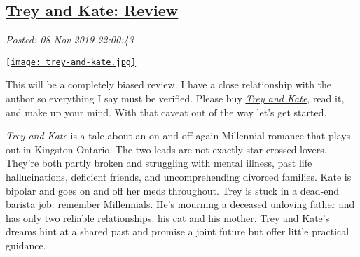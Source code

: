 %

\subsection*{\href{http://analyzethedatanotthedrivel.org/2019/11/08/trey-and-kate-review/}{Trey and Kate: Review}}


\noindent\emph{Posted: 08 Nov 2019 22:00:43}
\vspace{6pt}


\captionsetup[floatingfigure]{labelformat=empty}
\begin{floatingfigure}[l]{0.25\textwidth}
\centering
\href{https://www.amazon.com/gp/product/1687011508/ref=x_gr_w_bb_glide_sout?ie=UTF8\&tag=x_gr_w_bb_glide_sout-20\&linkCode=as2\&camp=1789\&creative=9325\&creativeASIN=1687011508\&SubscriptionId=1MGPYB6YW3HWK55XCGG2}{\texttt{[image: trey-and-kate.jpg]}}
\label{fig:5625x0}
\end{floatingfigure}

This will be a completely biased review.
I have a close relationship with the author so 
everything I say must be verified. Please buy \emph{\href{https://www.amazon.com/gp/product/1687011508/ref=x_gr_w_bb_glide_sout?ie=UTF8\&tag=x_gr_w_bb_glide_sout-20\&linkCode=as2\&camp=1789\&creative=9325\&creativeASIN=1687011508\&SubscriptionId=1MGPYB6YW3HWK55XCGG2}{Trey
and Kate}}, read it, and make up your mind. With that
caveat out of the way let's get started.

\emph{Trey and Kate} is a tale about an on and off again Millennial
romance that plays out in Kingston Ontario. The two leads are not
exactly star crossed lovers. They're both partly broken and struggling
with mental illness, past life hallucinations, deficient friends, and
uncomprehending divorced families. Kate is bipolar and goes on and off
her meds throughout. Trey is stuck in a dead-end barista job: remember
Millennials. He's mourning a deceased unloving father and has only two
reliable relationships: his cat and his mother. Trey and Kate's dreams
hint at a shared past and promise a joint future but offer little
practical guidance.

